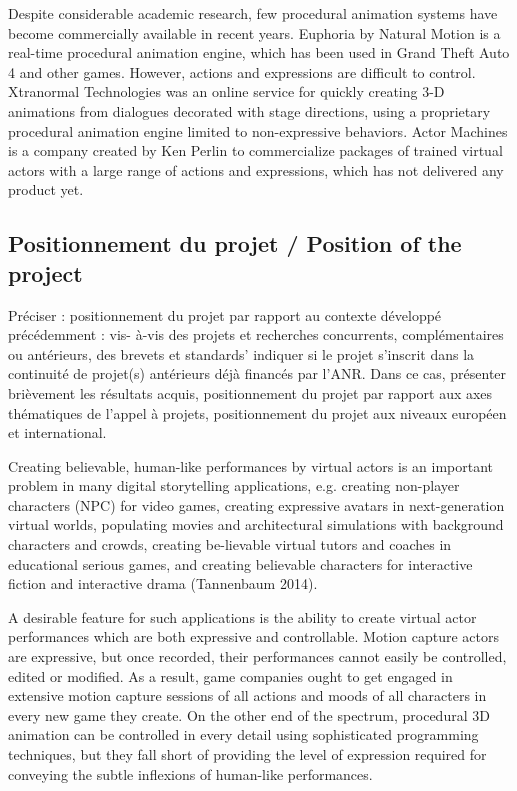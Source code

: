 Despite considerable academic research, few procedural animation systems have become commercially available in recent years. Euphoria by Natural Motion is a real-time procedural animation engine, which has been used in Grand Theft Auto 4 and other games. However, actions and expressions are difficult to control. Xtranormal Technologies was an online service for quickly creating 3-D animations from dialogues decorated with stage directions, using a proprietary procedural animation engine limited to non-expressive behaviors.  Actor Machines is a company created by Ken Perlin to commercialize packages of trained virtual actors  with a large range of actions and expressions, which has not delivered any product yet.




\subsection{Positionnement du projet / Position of the project}
\begin{xcomment}  
Pr\'eciser :
positionnement du projet par rapport au contexte d\'evelopp\'e pr\'ec\'edemment : vis- à-vis des projets et recherches concurrents, compl\'ementaires ou ant\'erieurs, des brevets et standards'
indiquer si le projet s'inscrit dans la continuit\'e de projet(s) ant\'erieurs d\'ejà financ\'es par l'ANR. Dans ce cas, pr\'esenter bri\`evement les r\'esultats acquis,
positionnement du projet par rapport aux axes th\'ematiques de l'appel à projets,
positionnement du projet aux niveaux europ\'een et international.
\end{xcomment}

Creating believable, human-like performances by virtual actors is an important problem in many digital storytelling applications, e.g. creating non-player characters (NPC) for video games, creating expressive avatars in next-generation virtual worlds, populating movies and architectural simulations with background characters and crowds, creating be-lievable virtual tutors and coaches in educational serious games, and creating believable characters for interactive fiction and interactive drama (Tannenbaum 2014).

A desirable feature for such applications is the ability to create virtual actor performances which are both expressive and controllable. Motion capture actors are expressive, but once recorded, their performances cannot easily be controlled, edited or modified. As a result, game companies ought to get engaged in extensive motion capture sessions of all actions and moods of all characters in every new game they create. On the other end of the spectrum, procedural 3D animation can be controlled in every detail using sophisticated programming techniques, but they fall short of providing the level of expression required for conveying the subtle inflexions of human-like performances.

